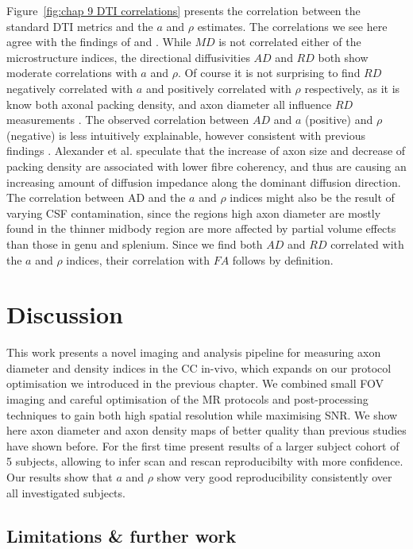 Figure~\ref{fig:chap 9 DTI correlations} presents the correlation between the standard DTI metrics and the $a$ and $\rho$ estimates. The correlations we see here agree with the findings of \citep{Barazany:2009} and \citep{Alexander:2010}. While $MD$ is not correlated either of the microstructure indices, the directional diffusivities $AD$ and $RD$ both show moderate correlations with $a$ and $\rho$. Of course it is not surprising to find $RD$ negatively correlated with $a$ and positively correlated with $\rho$ respectively, as it is know both axonal packing density, and axon diameter all influence $RD$ measurements \citep{Beaulieu:2002}. The observed correlation between $AD$ and $a$ (positive) and $\rho$ (negative) is less intuitively explainable, however consistent with previous findings \citep{Barazany:2009,Alexander:2010}. Alexander et al. speculate that the increase of axon size and decrease of packing density are associated with lower fibre coherency, and thus are causing an increasing amount of diffusion impedance along the dominant diffusion direction. The correlation between AD and the $a$ and $\rho$ indices might also be the result of varying CSF contamination, since the regions high axon diameter are mostly found in the thinner midbody region are more affected by partial volume effects than those in genu and splenium. Since we find both $AD$ and $RD$ correlated with the $a$ and $\rho$ indices, their correlation with $FA$ follows by definition.  
\egroup %
\FloatBarrier
\section{Discussion}
This work presents a novel imaging and analysis pipeline for measuring axon diameter and density indices in the CC in-vivo, which expands on our \SFasym{} protocol optimisation we introduced in the previous chapter. We combined small FOV imaging and careful optimisation of the MR protocols and post-processing techniques to gain both high spatial resolution while maximising SNR. We show here axon diameter and axon density maps of better quality than previous studies have shown before. For the first time present results of a larger subject cohort of 5 subjects, allowing to infer scan and rescan reproducibilty with more confidence. Our results show that $a$ and $\rho$ show very good reproducibility consistently over all investigated subjects. 

\subsection*{Limitations \& further work}
